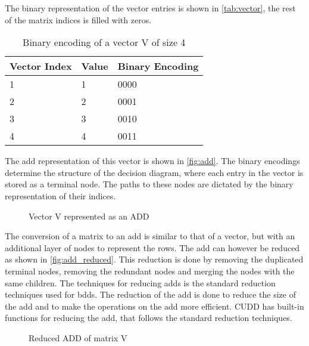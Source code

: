 The binary representation of the vector entries is shown in \autoref{tab:vector}, the rest of the matrix indices is filled with zeros.

\begin{table}
    \centering
    \caption{Binary encoding of a vector V of size 4}
    \label{tab:vector}
    \begin{tabular}{lll}
        \toprule
        Vector Index & Value & Binary Encoding \\
        \midrule
        1            & 1     & 0000            \\
        2            & 2     & 0001            \\
        3            & 3     & 0010            \\
        4            & 4     & 0011            \\
        \bottomrule
    \end{tabular}
\end{table}

The \gls{add} representation of this vector is shown in \autoref{fig:add}.
The binary encodings determine the structure of the decision diagram, where each entry in the vector is stored as a terminal node.
The paths to these nodes are dictated by the binary representation of their indices.

\begin{figure*}
    \centering
    
    \caption{Vector V represented as an ADD}
    \label{fig:add}
\end{figure*}

The conversion of a matrix to an \gls{add} is similar to that of a vector, but with an additional layer of nodes to represent the rows.
The \gls{add} can however be reduced as shown in \autoref{fig:add_reduced}.
This reduction is done by removing the duplicated terminal nodes, removing the redundant nodes and merging the nodes with the same children.
The techniques for reducing \glspl{add} is the standard reduction techniques used for \glspl{bdd}.
The reduction of the \gls{add} is done to reduce the size of the \gls{add} and to make the operations on the \gls{add} more efficient.
CUDD has built-in functions for reducing the \gls{add}, that follows the standard reduction techniques.

\begin{figure}
    \centering
    
    \caption{Reduced ADD of matrix V}
    \label{fig:add_reduced}
\end{figure}


